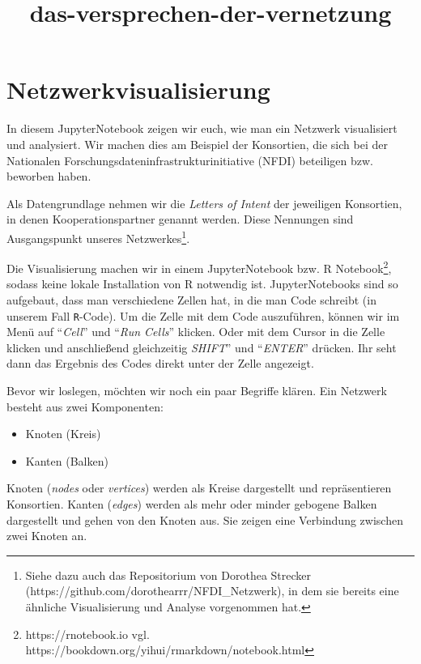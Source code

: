 \documentclass[11pt]{article}
\title{das-versprechen-der-vernetzung}
\providecommand{\tightlist}{%
      \setlength{\itemsep}{0pt}\setlength{\parskip}{0pt}}
\begin{document}
    
    \maketitle
    
    

    
    \hypertarget{netzwerkvisualisierung}{%
\section{Netzwerkvisualisierung}\label{netzwerkvisualisierung}}

In diesem JupyterNotebook zeigen wir euch, wie man ein Netzwerk
visualisiert und analysiert. Wir machen dies am Beispiel der Konsortien,
die sich bei der Nationalen Forschungsdateninfrastrukturinitiative
(NFDI) beteiligen bzw. beworben haben.

Als Datengrundlage nehmen wir die \emph{Letters of Intent} der
jeweiligen Konsortien, in denen Kooperationspartner genannt werden.
Diese Nennungen sind Ausgangspunkt unseres Netzwerkes\footnote{Siehe
  dazu auch das Repositorium von Dorothea Strecker
  (https://github.com/dorothearrr/NFDI\_Netzwerk), in dem sie bereits
  eine ähnliche Visualisierung und Analyse vorgenommen hat.}.

Die Visualisierung machen wir in einem JupyterNotebook bzw. R
Notebook\footnote{https://rnotebook.io vgl.
  https://bookdown.org/yihui/rmarkdown/notebook.html}, sodass keine
lokale Installation von R notwendig ist. JupyterNotebooks sind so
aufgebaut, dass man verschiedene Zellen hat, in die man Code schreibt
(in unserem Fall \texttt{R}-Code). Um die Zelle mit dem Code
auszuführen, können wir im Menü auf ``\emph{Cell}'' und ``\emph{Run
Cells}'' klicken. Oder mit dem Cursor in die Zelle klicken und
anschließend gleichzeitig \emph{SHIFT}'' und ``\emph{ENTER}'' drücken.
Ihr seht dann das Ergebnis des Codes direkt unter der Zelle angezeigt.

    Bevor wir loslegen, möchten wir noch ein paar Begriffe klären. Ein
Netzwerk besteht aus zwei Komponenten:

\begin{itemize}
\tightlist
\item
  Knoten (Kreis)
\item
  Kanten (Balken)
\end{itemize}

Knoten (\emph{nodes} oder \emph{vertices}) werden als Kreise dargestellt
und repräsentieren Konsortien. Kanten (\emph{edges}) werden als mehr
oder minder gebogene Balken dargestellt und gehen von den Knoten aus.
Sie zeigen eine Verbindung zwischen zwei Knoten an.
\end{document}
